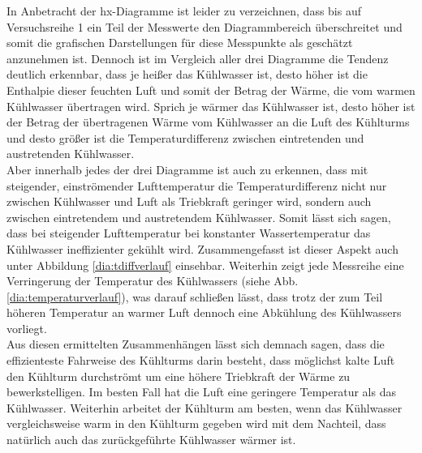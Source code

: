 In Anbetracht der hx-Diagramme ist leider zu verzeichnen, dass bis auf Versuchsreihe 1 ein Teil der Messwerte den Diagrammbereich überschreitet und somit die grafischen Darstellungen für diese Messpunkte als geschätzt anzunehmen ist. Dennoch ist im Vergleich aller drei Diagramme die Tendenz deutlich erkennbar, dass je heißer das Kühlwasser ist, desto höher ist die Enthalpie dieser feuchten Luft und somit der Betrag der Wärme, die vom warmen Kühlwasser übertragen wird. Sprich je wärmer das Kühlwasser ist, desto höher ist der Betrag der übertragenen Wärme vom Kühlwasser an die Luft des Kühlturms und desto größer ist die Temperaturdifferenz zwischen eintretenden und austretenden Kühlwasser. \\
\newpage
Aber innerhalb jedes der drei Diagramme ist auch zu erkennen, dass mit steigender, einströmender Lufttemperatur die Temperaturdifferenz nicht nur zwischen Kühlwasser und Luft als Triebkraft geringer wird, sondern auch zwischen eintretendem und austretendem Kühlwasser. Somit lässt sich sagen, dass bei steigender Lufttemperatur bei konstanter Wassertemperatur das Kühlwasser ineffizienter gekühlt wird. Zusammengefasst ist dieser Aspekt  auch unter Abbildung \ref{dia:tdiffverlauf} einsehbar. Weiterhin zeigt jede Messreihe eine Verringerung der Temperatur des Kühlwassers (siehe Abb. \ref{dia:temperaturverlauf}), was darauf schließen lässt, dass trotz der zum Teil höheren Temperatur an warmer Luft dennoch eine Abkühlung des Kühlwassers vorliegt. \\
Aus diesen ermittelten Zusammenhängen lässt sich demnach sagen, dass die effizienteste Fahrweise des Kühlturms darin besteht, dass möglichst kalte Luft den Kühlturm durchströmt um eine höhere Triebkraft der Wärme zu bewerkstelligen. Im besten Fall hat die Luft eine geringere Temperatur als das Kühlwasser. Weiterhin arbeitet der Kühlturm am besten, wenn das Kühlwasser vergleichsweise warm in den Kühlturm gegeben wird mit dem Nachteil, dass natürlich auch das zurückgeführte Kühlwasser wärmer ist.